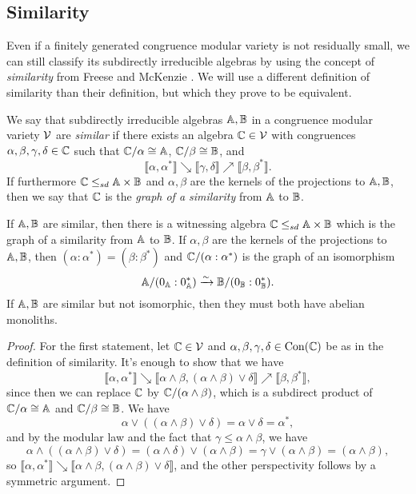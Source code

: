 \begin{appendices}
\subsection{Similarity}\label{ss-similarity}

Even if a finitely generated congruence modular variety is not residually small, we can still classify its subdirectly irreducible algebras by using the concept of \emph{similarity} from Freese and McKenzie \cite{commutator-theory}. We will use a different definition of similarity than their definition, but which they prove to be equivalent.

\begin{defn} We say that subdirectly irreducible algebras $\mathbb{A}, \mathbb{B}$ in a congruence modular variety $\mathcal{V}$ are \emph{similar} if there exists an algebra $\mathbb{C} \in \mathcal{V}$ with congruences $\alpha, \beta, \gamma, \delta \in \mathbb{C}$ such that $\mathbb{C}/\alpha \cong \mathbb{A}$, $\mathbb{C}/\beta \cong \mathbb{B}$, and
\[
\llbracket \alpha, \alpha^* \rrbracket \searrow \llbracket \gamma, \delta \rrbracket \nearrow \llbracket \beta, \beta^* \rrbracket.
\]
If furthermore $\mathbb{C} \le_{sd} \mathbb{A}\times \mathbb{B}$ and $\alpha, \beta$ are the kernels of the projections to $\mathbb{A},\mathbb{B}$, then we say that $\mathbb{C}$ is the \emph{graph of a similarity} from $\mathbb{A}$ to $\mathbb{B}$.
\end{defn}

\begin{prop}\label{similarity-graph} If $\mathbb{A}, \mathbb{B}$ are similar, then there is a witnessing algebra $\mathbb{C} \le_{sd} \mathbb{A}\times\mathbb{B}$ which is the graph of a similarity from $\mathbb{A}$ to $\mathbb{B}$. If $\alpha,\beta$ are the kernels of the projections to $\mathbb{A},\mathbb{B}$, then $(\alpha:\alpha^*) = (\beta:\beta^*)$ and $\mathbb{C}/(\alpha:\alpha^*)$ is the graph of an isomorphism
\[
\mathbb{A}/(0_{\mathbb{A}}:0_{\mathbb{A}}^*) \xrightarrow{\sim} \mathbb{B}/(0_{\mathbb{B}}:0_{\mathbb{B}}^*).
\]
If $\mathbb{A}, \mathbb{B}$ are similar but not isomorphic, then they must both have abelian monoliths.
\end{prop}
\begin{proof} For the first statement, let $\mathbb{C} \in \mathcal{V}$ and $\alpha,\beta,\gamma,\delta \in \operatorname{Con}(\mathbb{C})$ be as in the definition of similarity. It's enough to show that we have
\[
\llbracket \alpha, \alpha^* \rrbracket \searrow \llbracket \alpha\wedge\beta, (\alpha\wedge\beta)\vee \delta \rrbracket \nearrow \llbracket \beta, \beta^* \rrbracket,
\]
since then we can replace $\mathbb{C}$ by $\mathbb{C}/(\alpha\wedge\beta)$, which is a subdirect product of $\mathbb{C}/\alpha \cong \mathbb{A}$ and $\mathbb{C}/\beta \cong \mathbb{B}$. We have
\[
\alpha \vee ((\alpha\wedge\beta)\vee \delta) = \alpha\vee\delta = \alpha^*,
\]
and by the modular law and the fact that $\gamma \le \alpha \wedge \beta$, we have
\[
\alpha \wedge ((\alpha\wedge\beta)\vee \delta) = (\alpha \wedge \delta) \vee (\alpha \wedge \beta) = \gamma \vee (\alpha \wedge \beta) = (\alpha \wedge \beta),
\]
so $\llbracket \alpha, \alpha^* \rrbracket \searrow \llbracket \alpha\wedge\beta, (\alpha\wedge\beta)\vee \delta \rrbracket$, and the other perspectivity follows by a symmetric argument.


\end{proof}
\end{appendices}
